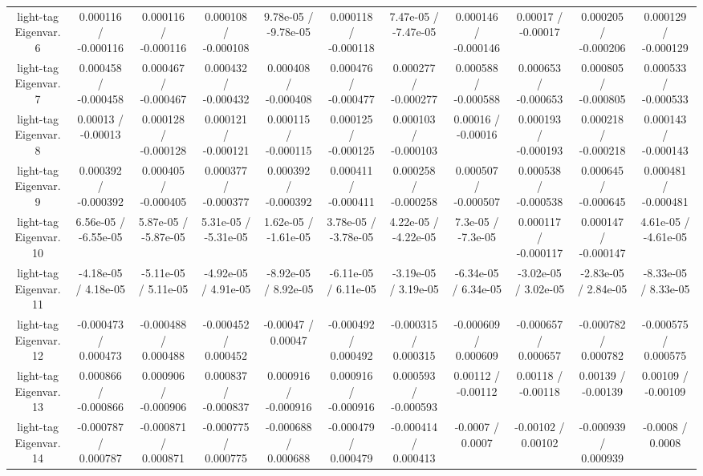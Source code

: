 \begin{table}[htbp]
\begin{center}
\begin{tabular}{|c|c|c|c|c|c|c|c|c|c|c|}
  light-tag Eigenvar. 6 & 0.000116 / -0.000116 & 0.000116 / -0.000116 & 0.000108 / -0.000108 & 9.78e-05 / -9.78e-05 & 0.000118 / -0.000118 & 7.47e-05 / -7.47e-05 & 0.000146 / -0.000146 & 0.00017 / -0.00017 & 0.000205 / -0.000206 & 0.000129 / -0.000129 \\ 
  light-tag Eigenvar. 7 & 0.000458 / -0.000458 & 0.000467 / -0.000467 & 0.000432 / -0.000432 & 0.000408 / -0.000408 & 0.000476 / -0.000477 & 0.000277 / -0.000277 & 0.000588 / -0.000588 & 0.000653 / -0.000653 & 0.000805 / -0.000805 & 0.000533 / -0.000533 \\ 
  light-tag Eigenvar. 8 & 0.00013 / -0.00013 & 0.000128 / -0.000128 & 0.000121 / -0.000121 & 0.000115 / -0.000115 & 0.000125 / -0.000125 & 0.000103 / -0.000103 & 0.00016 / -0.00016 & 0.000193 / -0.000193 & 0.000218 / -0.000218 & 0.000143 / -0.000143 \\ 
  light-tag Eigenvar. 9 & 0.000392 / -0.000392 & 0.000405 / -0.000405 & 0.000377 / -0.000377 & 0.000392 / -0.000392 & 0.000411 / -0.000411 & 0.000258 / -0.000258 & 0.000507 / -0.000507 & 0.000538 / -0.000538 & 0.000645 / -0.000645 & 0.000481 / -0.000481 \\ 
  light-tag Eigenvar. 10 & 6.56e-05 / -6.55e-05 & 5.87e-05 / -5.87e-05 & 5.31e-05 / -5.31e-05 & 1.62e-05 / -1.61e-05 & 3.78e-05 / -3.78e-05 & 4.22e-05 / -4.22e-05 & 7.3e-05 / -7.3e-05 & 0.000117 / -0.000117 & 0.000147 / -0.000147 & 4.61e-05 / -4.61e-05 \\ 
  light-tag Eigenvar. 11 & -4.18e-05 / 4.18e-05 & -5.11e-05 / 5.11e-05 & -4.92e-05 / 4.91e-05 & -8.92e-05 / 8.92e-05 & -6.11e-05 / 6.11e-05 & -3.19e-05 / 3.19e-05 & -6.34e-05 / 6.34e-05 & -3.02e-05 / 3.02e-05 & -2.83e-05 / 2.84e-05 & -8.33e-05 / 8.33e-05 \\ 
  light-tag Eigenvar. 12 & -0.000473 / 0.000473 & -0.000488 / 0.000488 & -0.000452 / 0.000452 & -0.00047 / 0.00047 & -0.000492 / 0.000492 & -0.000315 / 0.000315 & -0.000609 / 0.000609 & -0.000657 / 0.000657 & -0.000782 / 0.000782 & -0.000575 / 0.000575 \\ 
  light-tag Eigenvar. 13 & 0.000866 / -0.000866 & 0.000906 / -0.000906 & 0.000837 / -0.000837 & 0.000916 / -0.000916 & 0.000916 / -0.000916 & 0.000593 / -0.000593 & 0.00112 / -0.00112 & 0.00118 / -0.00118 & 0.00139 / -0.00139 & 0.00109 / -0.00109 \\ 
  light-tag Eigenvar. 14 & -0.000787 / 0.000787 & -0.000871 / 0.000871 & -0.000775 / 0.000775 & -0.000688 / 0.000688 & -0.000479 / 0.000479 & -0.000414 / 0.000413 & -0.0007 / 0.0007 & -0.00102 / 0.00102 & -0.000939 / 0.000939 & -0.0008 / 0.0008 \\ 

\end{tabular}
\end{center}
\end{table}
